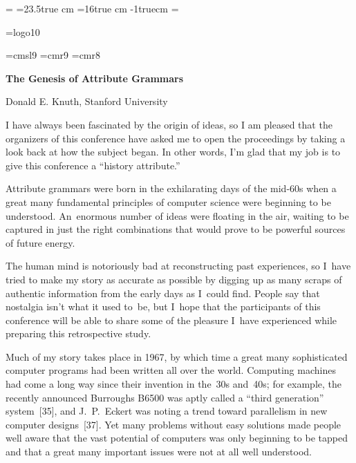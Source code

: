 \magnification=
\vsize=23.5true cm
\hsize=16true cm
\nopagenumbers
\topskip-1truecm
\headline={\tenrm\hfil\folio\hfil}
\raggedbottom
\abovedisplayskip=3mm
\belowdisplayskip=3mm
\abovedisplayshortskip=0mm
\belowdisplayshortskip=2mm
\normalbaselineskip=12pt
\normalbaselines

\def\TeX{T\hbox{\hskip-.1667em\lower.424ex\hbox{E}\hskip-.125em X}}

\font\logo=logo10 %
\def\MF{{\logo META}\-{\logo FONT}}

\def\bib{\par\noindent\hangindent 20pt}

\font\cmsl=cmsl9
\font\ninerm=cmr9
\font\eightrm=cmr8
\rm


\centerline{\bf The Genesis of Attribute Grammars}
\centerline{Donald E. Knuth, Stanford University}

\bigskip
I have always been fascinated by the origin of ideas, so I am
pleased that the organizers of this conference have asked me to open
the proceedings by taking a look back at how the subject began.
In other words, I'm glad that
my job is to give this conference a ``history attribute.''

Attribute grammars were born in the exhilarating days of the
mid-60s when a great many fundamental principles of computer science
were beginning to be understood. An~enormous number of ideas were
floating
in the air, waiting to be captured in just the right combinations 
that would prove to be powerful sources of future energy.

The human mind is notoriously bad at reconstructing past experiences, 
so I~have tried to make my story as accurate as possible by digging
up as many scraps of authentic information from the early days as 
I~could find. People say that nostalgia isn't what it used to~be,
but I~hope that the participants of this conference will be able to
share 
some of the pleasure I~have experienced while preparing this
retrospective study.

Much of my story takes place in 1967, by which time a great many
sophisticated computer programs had been written all over the world.
Computing machines had come a long way since their invention in 
the~30s and~40s; for example, the recently announced Burroughs B6500
was aptly called a ``third generation'' system~[35], and 
J.~P.~Eckert was noting a trend toward parallelism in new computer
designs~[37]. Yet many problems without easy solutions made
people well aware that the vast potential of computers was only
beginning to be tapped and that a great many important issues were
not at all well understood. 

